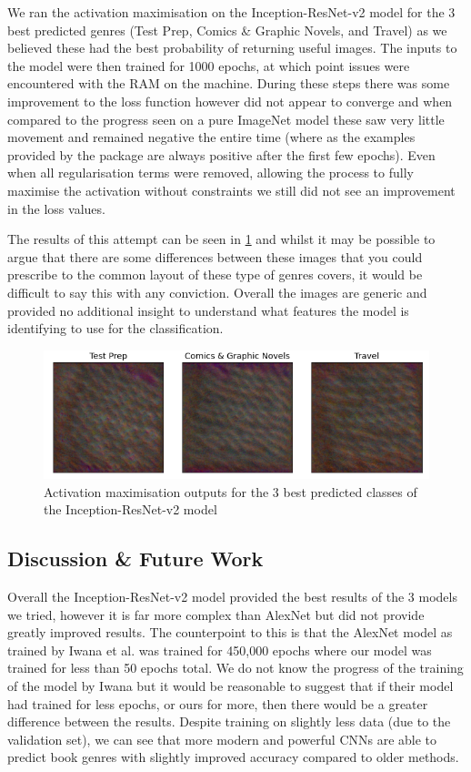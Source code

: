 \documentclass[12pt]{article}
\numberwithin{equation}{section}
\numberwithin{figure}{section}
\begin{document}
We ran the activation maximisation on the Inception-ResNet-v2 model for the 3 best predicted genres (Test Prep, Comics \& Graphic Novels, and Travel) as we believed these had the best probability of returning useful images. The inputs to the model were then trained for 1000 epochs, at which point issues were encountered with the RAM on the machine. During these steps there was some improvement to the loss function however did not appear to converge and when compared to the progress seen on a pure ImageNet model these saw very little movement and remained negative the entire time (where as the examples provided by the package are always positive after the first few epochs). Even when all regularisation terms were removed, allowing the process to fully maximise the activation without constraints we still did not see an improvement in the loss values.

The results of this attempt can be seen in \cref{fig:act_max_output} and whilst it may be possible to argue that there are some differences between these images that you could prescribe to the common layout of these type of genres covers, it would be difficult to say this with any conviction. Overall the images are generic and provided no additional insight to understand what features the model is identifying to use for the classification.

\begin{figure}
	\centering
	\captionsetup{justification=centering}
	\includegraphics[scale=0.6]{visualize-dense-layer.png}
	\caption{Activation maximisation outputs for the 3 best predicted classes of the Inception-ResNet-v2 model}
	\label{fig:act_max_output}
\end{figure}

\subsection{Discussion \& Future Work} 
\label{sub:Discussion} 
Overall the Inception-ResNet-v2 model provided the best results of the 3 models we tried, however it is far more complex than AlexNet but did not provide greatly improved results. The counterpoint to this is that the AlexNet model as trained by Iwana et al. was trained for 450,000 epochs where our model was trained for less than 50 epochs total. We do not know the progress of the training of the model by Iwana but it would be reasonable to suggest that if their model had trained for less epochs, or ours for more, then there would be a greater difference between the results. Despite training on slightly less data (due to the validation set), we can see that more modern and powerful CNNs are able to predict book genres with slightly improved accuracy compared to older methods.
\end{document}
